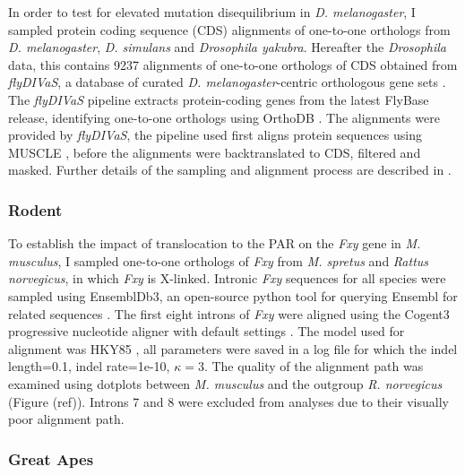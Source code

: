 In order to test for elevated mutation disequilibrium in \textit{D. melanogaster}, I sampled protein coding sequence (CDS) alignments of one-to-one orthologs from \textit{D. melanogaster}, \textit{D. simulans} and \textit{Drosophila yakubra}. Hereafter the \textit{Drosophila} data, this contains 9237 alignments of one-to-one orthologs of CDS obtained from \textit{flyDIVaS}, a database of curated \textit{D. melanogaster}-centric orthologous gene sets \citep{Stanley2016FlyDIVaS:Selection, Clark2007EvolutionPhylogeny}. The \textit{flyDIVaS} pipeline extracts protein-coding genes from the latest FlyBase release, identifying one-to-one orthologs using OrthoDB \citep{Zdobnov2021OrthoDBOrthologs}. The alignments were provided by \textit{flyDIVaS}, the pipeline used first aligns protein sequences using MUSCLE \citep{Edgar2004MUSCLE:Complexity}, before the alignments were backtranslated to CDS, filtered and masked. Further details of the sampling and alignment process are described in \citep{Stanley2016FlyDIVaS:Selection}. 

\subsubsection{Rodent}

To establish the impact of translocation to the PAR on the \textit{Fxy} gene in \textit{M. musculus}, I sampled one-to-one orthologs of \textit{Fxy} from \textit{M. spretus} and \textit{Rattus norvegicus}, in which \textit{Fxy} is X-linked. Intronic \textit{Fxy} sequences for all species were sampled using EnsemblDb3, an open-source python tool for querying Ensembl for related sequences \citep{HuttleyEnsembldb3}. The first eight introns of \textit{Fxy} were aligned using the Cogent3 progressive nucleotide aligner with default settings \citep{Knight2007PyCogent:Sequence}. The model used for alignment was HKY85 \citep{Hasegawa1985DatingDNA}, all parameters were saved in a log file for which the indel length=0.1, indel rate=1e-10, $\kappa=3$. The quality of the alignment path was examined using dotplots between \textit{M. musculus} and the outgroup \textit{R. norvegicus} (Figure (ref)). Introns 7 and 8 were excluded from analyses due to their visually poor alignment path. 

\subsubsection{Great Apes}

